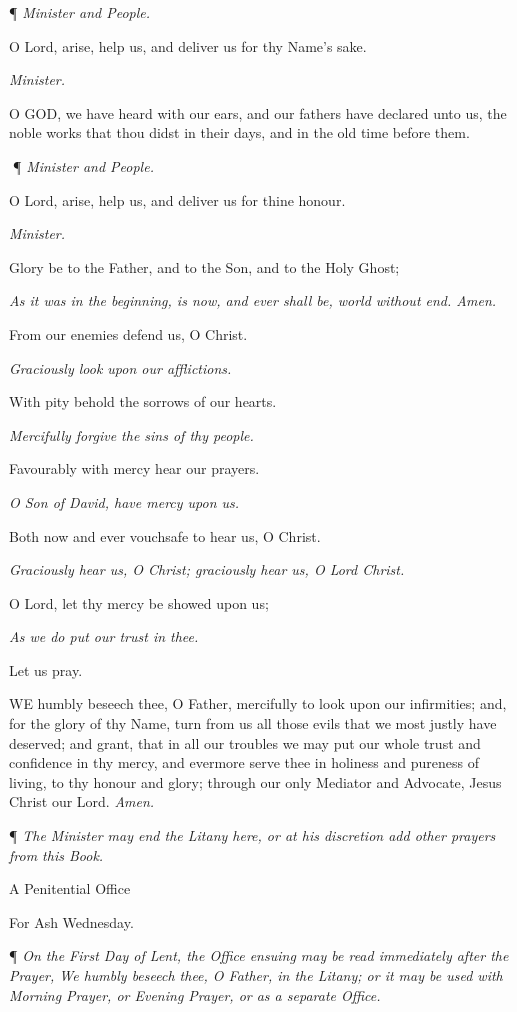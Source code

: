 ¶ \emph{Minister and People.}

O Lord, arise, help us, and deliver
us for thy Name's sake.

\emph{Minister.}

O GOD, we have heard with
our ears, and our fathers have declared unto us, the noble works that
thou didst in their days, and in the old time before them.

¶ \emph{Minister and People.}

O Lord, arise, help us, and deliver
us for thine honour.

\emph{Minister.}

Glory be to the Father, and to the
Son, and to the Holy Ghost; 

\emph{As it was in the beginning, is now, and ever shall
be, world without end. Amen.}

From our enemies defend us, O Christ. 

\emph{Graciously look upon our afflictions.}

With pity behold the sorrows of our hearts. 

\emph{Mercifully forgive the sins of thy people.}

Favourably with mercy hear our prayers. 

\emph{O Son of David, have mercy upon us.}

Both now and ever vouchsafe to hear us, O Christ. 

\emph{Graciously hear us, O Christ; graciously hear us,
O Lord Christ.}

O Lord, let thy mercy be showed upon
us; 

\emph{As we do put our trust in thee.}

Let us pray.

WE humbly beseech thee,
O Father, mercifully to look upon our infirmities; and, for the glory
of thy Name, turn from us all those evils that we most justly have deserved;
and grant, that in all our troubles we may put our whole trust and confidence
in thy mercy, and evermore serve thee in holiness and pureness of living,
to thy honour and glory; through our only Mediator and Advocate, Jesus
Christ our Lord. \emph{Amen.}

¶ \emph{The Minister
may end the Litany here, or at his discretion add other prayers from this
Book.}

A Penitential Office

For Ash Wednesday.

¶ \emph{On the First
Day of Lent, the Office ensuing may be read immediately after the Prayer,
We humbly beseech thee, O Father, in the Litany; or it may be used with
Morning Prayer, or Evening Prayer, or as a separate Office.}

